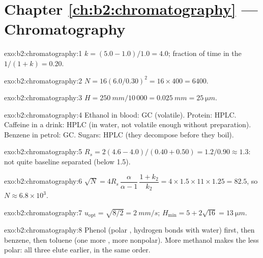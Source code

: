 \section*{Chapter \ref{ch:b2:chromatography} --- Chromatography}

\begin{solution}{exo:b2:chromatography:1}
$k = (5.0 - 1.0)/1.0 = 4.0$; fraction of time in the  $1/(1 + k) = 0.20$.
\end{solution}

\begin{solution}{exo:b2:chromatography:2}
$N = 16(6.0/0.30)^2 = 16 \times 400 = 6400$.
\end{solution}

\begin{solution}{exo:b2:chromatography:3}
$H = \qty{250}{mm}/10\,000 = \qty{0.025}{mm} = \qty{25}{\micro m}$.
\end{solution}

\begin{solution}{exo:b2:chromatography:4}
Ethanol in blood: GC (volatile). Protein: HPLC. Caffeine in a drink: HPLC (in water, not volatile
enough without preparation). Benzene in petrol: GC. Sugars: HPLC (they decompose before they boil).
\end{solution}

\begin{solution}{exo:b2:chromatography:5}
$R_s = 2(4.6 - 4.0)/(0.40 + 0.50) = 1.2/0.90 \approx 1.3$: not quite baseline separated (below 1.5).
\end{solution}

\begin{solution}{exo:b2:chromatography:6}
$\sqrt N = 4R_s\,\dfrac{\alpha}{\alpha - 1}\,\dfrac{1 + k_2}{k_2} = 4 \times 1.5 \times 11 \times 1.25 =
82.5$, so $N \approx 6.8 \times 10^3$.
\end{solution}

\begin{solution}{exo:b2:chromatography:7}
$u_{\mathrm{opt}} = \sqrt{8/2} = \qty{2}{mm/s}$; $H_{\min} = 5 + 2\sqrt{16} = \qty{13}{\micro m}$.
\end{solution}

\begin{solution}{exo:b2:chromatography:8}
Phenol (polar , hydrogen bonds with water) first, then benzene, then toluene (one more
, more nonpolar). More methanol makes the  less polar: all three elute earlier, in
the same order.
\end{solution}

